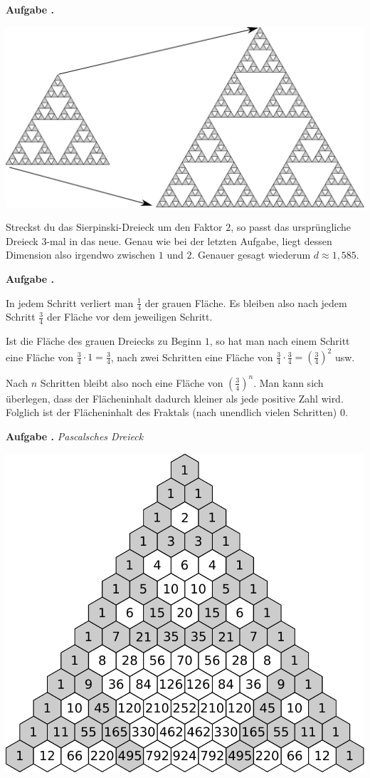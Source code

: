 \documentclass[a4paper,ngerman,12pt]{scrartcl}
\theoremstyle{definition}
\theoremstyle{plain}
\theoremstyle{remark}
\newlength{\aufgabenskip}
\newcounter{aufgabennummer}
\newenvironment{aufgabe}[1]{
  \addtocounter{aufgabennummer}{1}
  \textbf{Aufgabe \theaufgabennummer.} \emph{#1} \par
}{\vspace{\aufgabenskip}}
\begin{document}
\begin{aufgabe}{}\label{aufgabe:Sierpinski-Flaeche}
	\begin{center}
		\includegraphics[width=.7\textwidth]{Bilder/Sierpinski-Dreieck-Vergroessern.pdf}
	\end{center}
	Streckst du das Sierpinski-Dreieck um den Faktor $2$, so passt das ursprüngliche Dreieck $3$-mal in das neue. Genau wie bei der letzten Aufgabe, liegt dessen Dimension also irgendwo zwischen $1$ und $2$. Genauer gesagt wiederum $d \approx 1,585$.
\end{aufgabe}

\begin{aufgabe}{}
	In jedem Schritt verliert man $\frac{1}{4}$ der grauen Fläche. Es bleiben also nach jedem Schritt $\frac{3}{4}$ der Fläche vor dem jeweiligen Schritt.
	
	Ist die Fläche des grauen Dreiecks zu Beginn $1$, so hat man nach einem Schritt eine Fläche von $\frac{3}{4}\cdot 1 = \frac{3}{4}$, nach zwei Schritten eine Fläche von $\frac{3}{4} \cdot \frac{3}{4} = \left(\frac{3}{4}\right)^2$ usw.
	
	Nach $n$ Schritten bleibt also noch eine Fläche von $\left(\frac{3}{4}\right)^n$. Man kann sich überlegen, dass der Flächeninhalt dadurch kleiner als jede positive Zahl wird. Folglich ist der Flächeninhalt des Fraktals (\glqq nach unendlich vielen Schritten\grqq) $0$.
\end{aufgabe}

\begin{aufgabe}{Pascalsches Dreieck}
	\begin{center}
		\includegraphics[width=.6\textwidth]{Bilder/Pascalsches-Dreieck-gefuellt-grau.pdf}
	\end{center}
\end{aufgabe}
\end{document}
